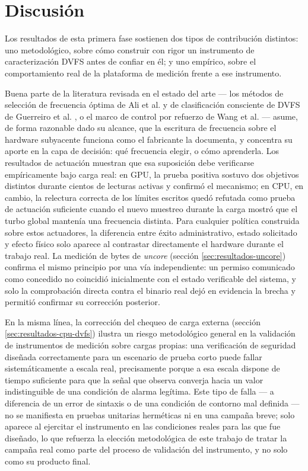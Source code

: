 \documentclass[12pt,oneside,spanish]{book}
\begin{document}

\chapter{Discusión}

Los resultados de esta primera fase sostienen dos tipos de contribución distintos: uno metodológico, sobre cómo construir con rigor un instrumento de caracterización DVFS antes de confiar en él; y uno empírico, sobre el comportamiento real de la plataforma de medición frente a ese instrumento.

Buena parte de la literatura revisada en el estado del arte --- los métodos de selección de frecuencia óptima de Ali et al. \cite{Ali2023} y de clasificación consciente de DVFS de Guerreiro et al. \cite{Guerreiro2019}, o el marco de control por refuerzo de Wang et al. \cite{Wang2024} --- asume, de forma razonable dado su alcance, que la escritura de frecuencia sobre el hardware subyacente funciona como el fabricante la documenta, y concentra su aporte en la capa de decisión: qué frecuencia elegir, o cómo aprenderla. Los resultados de actuación muestran que esa suposición debe verificarse empíricamente bajo carga real: en GPU, la prueba positiva sostuvo dos objetivos distintos durante cientos de lecturas activas y confirmó el mecanismo; en CPU, en cambio, la relectura correcta de los límites escritos quedó refutada como prueba de actuación suficiente cuando el nuevo muestreo durante la carga mostró que el turbo global mantenía una frecuencia distinta. Para cualquier política construida sobre estos actuadores, la diferencia entre éxito administrativo, estado solicitado y efecto físico solo aparece al contrastar directamente el hardware durante el trabajo real. La medición de bytes de \textit{uncore} (sección \ref{sec:resultados-uncore}) confirma el mismo principio por una vía independiente: un permiso comunicado como concedido no coincidió inicialmente con el estado verificable del sistema, y solo la comprobación directa contra el binario real dejó en evidencia la brecha y permitió confirmar su corrección posterior.

En la misma línea, la corrección del chequeo de carga externa (sección \ref{sec:resultados-cpu-dvfs}) ilustra un riesgo metodológico general en la validación de instrumentos de medición sobre cargas propias: una verificación de seguridad diseñada correctamente para un escenario de prueba corto puede fallar sistemáticamente a escala real, precisamente porque a esa escala dispone de tiempo suficiente para que la señal que observa converja hacia un valor indistinguible de una condición de alarma legítima. Este tipo de falla --- a diferencia de un error de sintaxis o de una condición de contorno mal definida --- no se manifiesta en pruebas unitarias herméticas ni en una campaña breve; solo aparece al ejercitar el instrumento en las condiciones reales para las que fue diseñado, lo que refuerza la elección metodológica de este trabajo de tratar la campaña real como parte del proceso de validación del instrumento, y no solo como su producto final.
\end{document}
